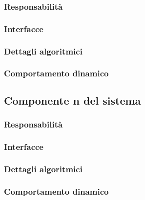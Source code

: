 
\subsubsection{Responsabilità}

\subsubsection{Interfacce}

\subsubsection{Dettagli algoritmici}

\subsubsection{Comportamento dinamico}

\subsection{Componente n del sistema}

\subsubsection{Responsabilità}

\subsubsection{Interfacce}

\subsubsection{Dettagli algoritmici}

\subsubsection{Comportamento dinamico}

